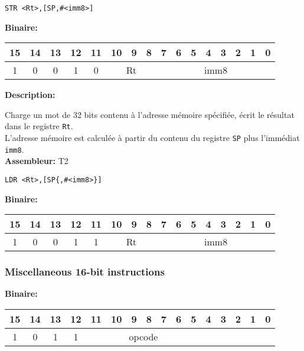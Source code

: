 \documentclass{article}
\newcounter{subsubsubsection}[subsubsection]
\begin{document}
\begin{lstlisting}
STR <Rt>,[SP,#<imm8>]
\end{lstlisting}

\textbf{Binaire:}\\

\begin{tabular}{| c c c c c c c c c c c c c c c c |}
\hline
15 & 14 & 13 & 12 & \multicolumn{1}{|c}{11} & \multicolumn{1}{|c}{10} & 9 & 8 & \multicolumn{1}{|c}{7} & 6 & 5 & 4 & 3 & 2 & 1 & 0 \\
\hline
1 & 0 & 0 & 1 & \multicolumn{1}{|c}{0} & \multicolumn{3}{|c}{Rt} & \multicolumn{8}{|c|}{imm8} \\
\hline
\end{tabular}



\textbf{Description: }

Charge un mot de 32 bits contenu à l'adresse mémoire spécifiée, écrit le résultat dans le registre \texttt{Rt}.\\
L'adresse mémoire est calculée à partir du contenu du registre \texttt{SP} plus l'immédiat \texttt{imm8}.\\

\textbf{Assembleur:} T2

\begin{lstlisting}
LDR <Rt>,[SP{,#<imm8>}]
\end{lstlisting}

\textbf{Binaire:}\\

\begin{tabular}{| c c c c c c c c c c c c c c c c |}
\hline
15 & 14 & 13 & 12 & \multicolumn{1}{|c}{11} & \multicolumn{1}{|c}{10} & 9 & 8 & \multicolumn{1}{|c}{7} & 6 & 5 & 4 & 3 & 2 & 1 & 0 \\
\hline
1 & 0 & 0 & 1 & \multicolumn{1}{|c}{1} & \multicolumn{3}{|c}{Rt} & \multicolumn{8}{|c|}{imm8} \\
\hline
\end{tabular}



\subsubsection{Miscellaneous 16-bit instructions}

\textbf{Binaire:}\\

\begin{tabular}{| c c c c c c c c c c c c c c c c |}
\hline
15 & 14 & 13 & 12 & \multicolumn{1}{|c}{11} & 10 & 9 & 8 & 7 & 6 & 5 & \multicolumn{1}{|c}{4} & 3 & 2 & 1 & 0 \\
\hline
1 & 0 & 1 & 1 & \multicolumn{7}{|c}{opcode} & \multicolumn{5}{|c|}{} \\
\hline
\end{tabular}
\end{document}
